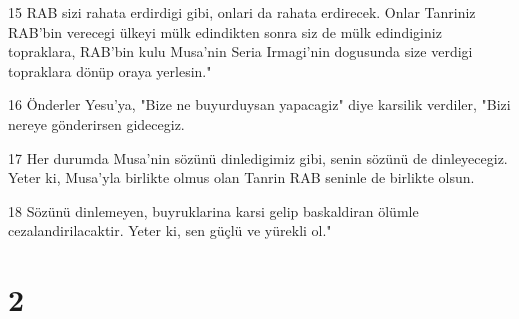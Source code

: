 \par 15 RAB sizi rahata erdirdigi gibi, onlari da rahata erdirecek. Onlar Tanriniz RAB'bin verecegi ülkeyi mülk edindikten sonra siz de mülk edindiginiz topraklara, RAB'bin kulu Musa'nin Seria Irmagi'nin dogusunda size verdigi topraklara dönüp oraya yerlesin."
\par 16 Önderler Yesu'ya, "Bize ne buyurduysan yapacagiz" diye karsilik verdiler, "Bizi nereye gönderirsen gidecegiz.
\par 17 Her durumda Musa'nin sözünü dinledigimiz gibi, senin sözünü de dinleyecegiz. Yeter ki, Musa'yla birlikte olmus olan Tanrin RAB seninle de birlikte olsun.
\par 18 Sözünü dinlemeyen, buyruklarina karsi gelip baskaldiran ölümle cezalandirilacaktir. Yeter ki, sen güçlü ve yürekli ol."

\chapter{2}

